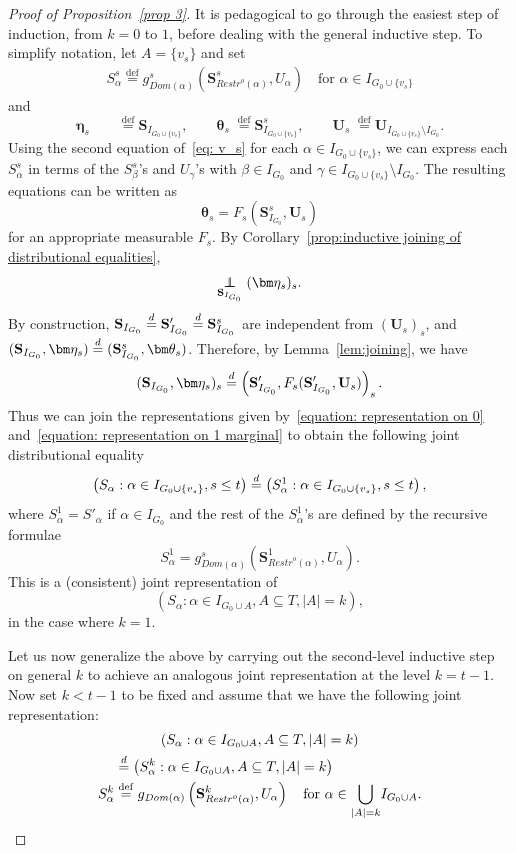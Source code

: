 \documentclass[10pt]{amsart}
\theoremstyle{definition}\newtheorem{defi}[theo]{Definition}\newtheorem{rema}[theo]{Remark}\newtheorem{exam}[theo]{Example}\newtheorem{exem}[theo]{Example}\newtheorem{nota}[theo]{Notation}
\newcommand{\independent}{\protect\mathpalette{\protect\independenT}{\perp}}\def\independenT#1#2{\mathrel{\rlap{$#1#2$}\mkern2mu{#1#2}}}
\newcommand{\alf}{\alpha}%
\newcommand*{\defeq}{\stackrel{\mathrm{def}}{=}}
\renewcommand{\d}{\buildrel{d}\over{=}}
\newcommand*\srstr{\mathit{Restr}^o}
\newcommand*\dom{\mathit{Dom}}
\newcommand*\bS{\mathbf{S}}
\newcommand*\bU{\mathbf{U}}
\begin{document}
\begin{proof}[Proof of Proposition~\ref{prop 3}]
It is pedagogical to go through the easiest step of induction, from $k=0$ to $1$, before dealing with the general inductive step. To simplify notation, let $A=\{v_s\}$ and set
\begin{align}\label{eq: v_s}
S^s_\alf
\defeq g^s_{\dom(\alf)}\left(\bS^s_{\srstr(\alf)}, U_\alf\right) \quad\text{for } \alf \in I_{G_0 \cup \{v_s\}}
\end{align}
and
\[
\bm\eta_s \qquad
\defeq\bS_{I_{G_0 \cup \{v_s\}}},\qquad
\bm\theta_s \;
\defeq\bS^s_{I_{G_0 \cup \{v_s\}}}, \qquad
\bU_s \;
\defeq\bU_{I_{{G_0} \cup \{v_s\}} \setminus I_{G_0}}.
\]
Using the second equation of~\eqref{eq: v_s} for each $\alpha \in I_{G_0 \cup \{v_s\}}$, we can express each $S^s_\alpha$ in terms of the $S^s_\beta$'s
and $U_\gamma$'s with $\beta \in I_{G_0}$ and $\gamma \in I_{G_0 \cup \{v_s\}}\setminus I_{G_0}$. The resulting equations can be written as
\[
\bm\theta_s=F_s\left(\bS^s_{I_{G_0}}, \bU_s\right)
\]
for an appropriate measurable $F_s$. By Corollary~\ref{prop:inductive joining of distributional equalities},
\[
\underset{\bS_{I_{G_0}}}{\independent} (\bm\eta_s)_s.
\]
By construction, $\bS_{I_{G_0}} \d \bS'_{I_{G_0}}\d \bS^s_{I_{G_0}}$ are independent from $(\bU_s)_s$, and $(\bS_{I_{G_0}},\bm\eta_s)\d (\bS^s_{I_{G_0}},\bm\theta_s)$. Therefore, by Lemma~\ref{lem:joining}, we have
\[
(\bS_{I_{G_0}}, \bm\eta_s)_s \d \left(\bS'_{I_{G_0}},F_s(\bS'_{I_{G_0}},\bU_s)\right)_s.
\]
Thus we can join the representations given by~\eqref{equation: representation on 0} and~\eqref{equation: representation on 1 marginal} to obtain the following joint distributional equality
\begin{equation}\label{equation: representation on 1 joint}
\left(S_\alf : \alf \in I_{G_0 \cup \{v_s\}}, s \leq t\right)\d\left(S^1_\alf : \alf \in I_{G_0 \cup \{v_s\}}, s \leq t\right),
\end{equation}
where $S^1_\alf =S'_\alf $ if $\alf \in I_{G_0}$ and the rest of the $S^1_\alf $'s are defined by the recursive formulae
\[
S^1_\alf =g^s_{\dom(\alf)}\left(\bS^1_{\srstr(\alf)}, U_\alf\right).
\]
This is a (consistent) joint representation of
\[
(S_\alf : \alf \in I_{G_0 \cup A}, A \subseteq T, |A|=k),
\]
in the case where $k=1$.

Let us now generalize the above by carrying out the second-level inductive step on general $k$ to achieve an analogous joint representation at the level $k=t-1$. Now set $k<t-1$ to be fixed and assume that we have the following joint representation:
\begin{multline}\label{equation: representation on k joint}
\left(S_\alf :\alf \in I_{G_0 \cup A}, A \subseteq T, |A|=k\right) \\
\begin{aligned}
&\d \left(S^k_\alf : \alf \in I_{G_0 \cup A}, A \subseteq T, |A|=k\right)
\\
S^k_\alf &
\defeq g_{\dom(\alf)}\left(\bS^k_{\srstr(\alf)}, U_\alf\right) \quad \text{for } \alf \in \underset{|A|=k}{\bigcup}I_{G_0 \cup A}.
\end{aligned}
\end{multline}



\end{proof}
\end{document}
